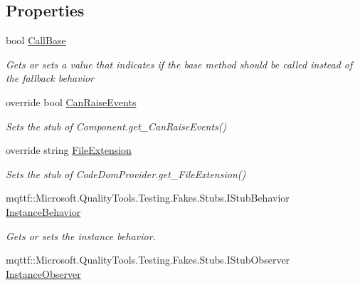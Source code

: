 \subsection*{Properties}
\begin{DoxyCompactItemize}
\item 
bool \hyperlink{class_system_1_1_code_dom_1_1_compiler_1_1_fakes_1_1_stub_code_dom_provider_ab7d1ecc9051761901854e225181d633c}{Call\-Base}
\begin{DoxyCompactList}\small\item\em Gets or sets a value that indicates if the base method should be called instead of the fallback behavior\end{DoxyCompactList}\item 
override bool \hyperlink{class_system_1_1_code_dom_1_1_compiler_1_1_fakes_1_1_stub_code_dom_provider_a0f36178b1a1ef3b59422512963a04017}{Can\-Raise\-Events}
\begin{DoxyCompactList}\small\item\em Sets the stub of Component.\-get\-\_\-\-Can\-Raise\-Events()\end{DoxyCompactList}\item 
override string \hyperlink{class_system_1_1_code_dom_1_1_compiler_1_1_fakes_1_1_stub_code_dom_provider_a6c81889a441869e9f122749626d4b91b}{File\-Extension}
\begin{DoxyCompactList}\small\item\em Sets the stub of Code\-Dom\-Provider.\-get\-\_\-\-File\-Extension()\end{DoxyCompactList}\item 
mqttf\-::\-Microsoft.\-Quality\-Tools.\-Testing.\-Fakes.\-Stubs.\-I\-Stub\-Behavior \hyperlink{class_system_1_1_code_dom_1_1_compiler_1_1_fakes_1_1_stub_code_dom_provider_ae84a4d6a9ee4af6fdd229596868e59d4}{Instance\-Behavior}
\begin{DoxyCompactList}\small\item\em Gets or sets the instance behavior.\end{DoxyCompactList}\item 
mqttf\-::\-Microsoft.\-Quality\-Tools.\-Testing.\-Fakes.\-Stubs.\-I\-Stub\-Observer \hyperlink{class_system_1_1_code_dom_1_1_compiler_1_1_fakes_1_1_stub_code_dom_provider_a3fa0d834c673ecfe5779034704a12c9b}{Instance\-Observer}

\end{DoxyCompactItemize}
